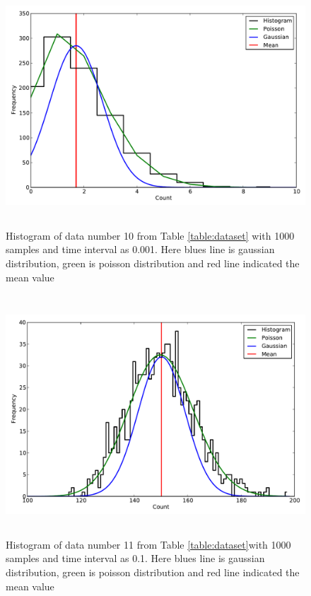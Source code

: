 \documentclass[a4paper,12pt]{article}
\begin{document}
\begin{figure}[H]
\centering
\includegraphics[angle=0,height=9cm,width=15.5cm]{graphs/Hist_distribution_small.pdf}
\caption{Histogram of data number 10 from Table \ref{table:dataset} with 1000 samples and time interval as 0.001. Here blues line is gaussian distribution, green is poisson distribution and red line indicated the mean value}
\label{fig:dark_plot}
\end{figure}

\begin{figure}[H]
\centering
\includegraphics[angle=0,height=9cm,width=15.5cm]{graphs/Hist_distribution_big.pdf}
\caption{Histogram of data number 11 from Table \ref{table:dataset}with 1000 samples and time interval as 0.1. Here blues line is gaussian distribution, green is poisson distribution and red line indicated the mean value}
\label{fig:dark_hist}
\end{figure}
\end{document}
